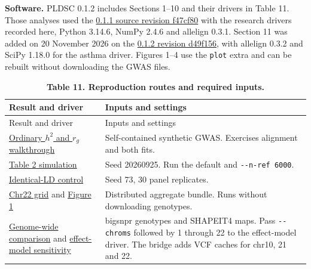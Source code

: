 \documentclass[11pt,a4paper]{article}
\begin{document}
\textbf{Software.} PLDSC 0.1.2 includes Sections 1--10 and their drivers in Table 11. Those analyses used the \href{https://github.com/bvilhjal/PLDSC/tree/f47cf8031d527834d7c6243bed6a50c861cd51c2}{0.1.1 source revision f47cf80} with the research drivers recorded here, Python 3.14.6, NumPy 2.4.6 and allelign 0.3.1. Section 11 was added on 20 November 2026 on the \href{https://github.com/bvilhjal/PLDSC/tree/d49f156}{0.1.2 revision d49f156}, with allelign 0.3.2 and SciPy 1.18.0 for the asthma driver. Figures 1--4 use the \texttt{plot} extra and can be rebuilt without downloading the GWAS files.

\begin{longtable}[]{@{}
  >{\raggedright\arraybackslash}p{}
  >{\raggedright\arraybackslash}p{}@{}}
\caption{\textbf{Table 11. Reproduction routes and required inputs.}}\tabularnewline
\toprule\noalign{}
\begin{minipage}[b]{\linewidth}\raggedright
Result and driver
\end{minipage} & \begin{minipage}[b]{\linewidth}\raggedright
Inputs and settings
\end{minipage} \\
\midrule\noalign{}
\endfirsthead
\toprule\noalign{}
\begin{minipage}[b]{\linewidth}\raggedright
Result and driver
\end{minipage} & \begin{minipage}[b]{\linewidth}\raggedright
Inputs and settings
\end{minipage} \\
\midrule\noalign{}
\endhead
\bottomrule\noalign{}
\endlastfoot
\href{../examples/ordinary_ldsc.py}{Ordinary \(h^2\) and \(r_g\) walkthrough} & Self-contained synthetic GWAS. Exercises alignment and both fits. \\
\href{../experiments/multiancestry_meta_sim.py}{Table 2 simulation} & Seed 20260925. Run the default and \texttt{-\/-n-ref\ 6000}. \\
\href{../experiments/reference_score_noise.py}{Identical-LD control} & Seed 73, 30 panel replicates. \\
\href{../examples/reproduce_chr22_tables.py}{Chr22 grid} and \href{reference_figure.py}{Figure 1} & Distributed aggregate bundle. Runs without downloading genotypes. \\
\href{../experiments/multiancestry_genome_kappa.py}{Genome-wide comparison} and \href{../experiments/multiancestry_alpha_kappa.py}{effect-model sensitivity} & bigsnpr genotypes and SHAPEIT4 maps. Pass \texttt{-\/-chroms} followed by 1 through 22 to the effect-model driver. The bridge adds VCF caches for chr10, 21 and 22. \\

\end{longtable}
\end{document}
